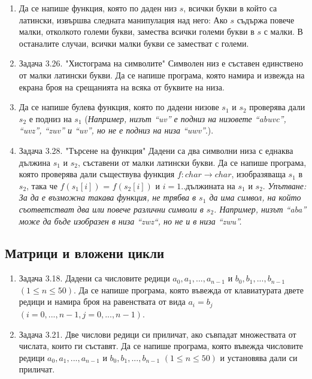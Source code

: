{\begin{enumerate}[resume]
  \item Да се напише функция, която по даден низ $s$, всички букви в който са латински, извършва следната манипулация над него: Ако $s$ съдържа повече малки, отколкото големи букви, замества всички големи букви в $s$ с малки. В останалите случаи, всички малки букви се заместват с големи.

	\item Задача 3.26. "Хистограма на символите" \cite{sbornik} Символен низ е съставен единствено от малки латински букви. Да се напише програма, която намира и извежда на екрана броя на срещанията на всяка от буквите на низа.

  \item Да се напише булева функция, която по дадени низове $s_1$ и $s_2$ проверява дали $s_2$ е подниз на $s_1$ (\textit{Например, низът ``uv'' е подниз на низовете ``abuvc'', ``uvz'', ``zuv'' и ``uv'', но не е подниз на низа ``uwv''}.). 

  \item Задача 3.28. "Търсене на функция" \cite{sbornik} Дадени са два символни низа с еднаква дължина $s_1$ и $s_2$, съставени от малки латински букви. Да се напише програма, която проверява дали съществува функция $f:char \rightarrow char$, изобразяваща $s_1$ в $s_2$, така че $f(s_1[i])$ = $f(s_2[i])$ и $i=1..$дължината на $s_1$ и $s_2$. \textit{Упътване: За да е възможна такава функция, не трябва в $s_1$ да има символ, на който съответстват два или повече различни символи в $s_2$. Например, низът ``aba'' може да бъде изобразен в низа ``zwz``, но не и в низа ``zwu''.}
  
\end{enumerate}


\pagebreak

\subsection {Матрици и вложени цикли}

\begin{enumerate}[resume]

	\item Задача 3.18. \cite{sbornik} Дадени са числовите редици $a_0, a_1, ..., a_{n-1}$ и $b_0, b_1, ..., b_{n-1}$ $(1 \leq n \leq 50)$. Да се напише програма, която въвежда от клавиатурата двете редици и намира броя на равенствата от вида $a_i = b_j$ $(i = 0, ..., n-1, j = 0, ..., n-1)$.

	\item Задача 3.21. \cite{sbornik} Две числови редици си приличат, ако съвпадат множествата от числата, които ги съставят. Да се напише програма, която въвежда числовите редици $a_0, a_1, ..., a_{n-1}$ и $b_0, b_1, ..., b_{n-1}$ $(1 \leq n \leq 50)$ и установява дали си приличат.


\end{enumerate}}
